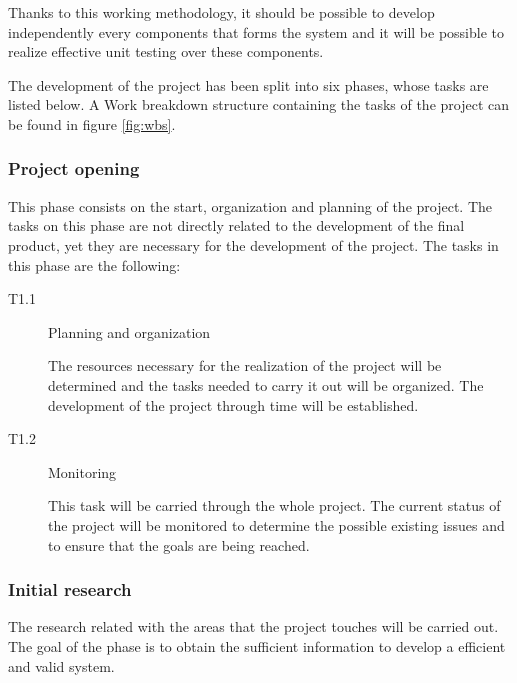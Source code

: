 Thanks to this working methodology, it should be possible to develop independently every components that forms the system and it will be possible to realize effective unit testing over these components.

The development of the project has been split into six phases, whose tasks are listed below. A Work breakdown structure containing the tasks of the project can be found in figure \ref{fig:wbs}.

\subsubsection*{Project opening}
 
This phase consists on the start, organization and planning of the project. The tasks on this phase are not directly related to the development of the final product, yet they are necessary for the development of the project. The tasks in this phase are the following:

\begin{description}
\item[T1.1] Planning and organization

The resources necessary for the realization of the project will be determined and the tasks needed to carry it out will be organized. The development of the project through time will be established.

\item[T1.2] Monitoring

This task will be carried through the whole project. The current status of the project will be monitored to determine the possible existing issues and to ensure that the goals are being reached.
\end{description}

\subsubsection*{Initial research}

The research related with the areas that the project touches will be carried out. The goal of the phase is to obtain the sufficient information to develop a efficient and valid system.

